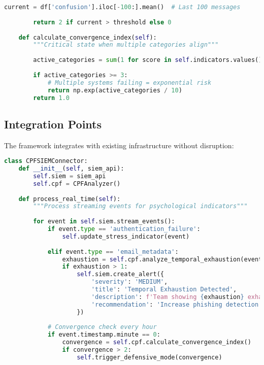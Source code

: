 \documentclass[11pt,a4paper]{article}
\begin{document}
\begin{lstlisting}[language=Python, caption=Core CPF Processing Pipeline]
        current = df['confusion'].iloc[-100:].mean()  # Last 100 messages
        
        return 2 if current > threshold else 0
        
    def calculate_convergence_index(self):
        """Critical state when multiple categories align"""
        
        active_categories = sum(1 for score in self.indicators.values() if score > 1)
        
        if active_categories >= 3:
            # Multiple systems failing = exponential risk
            return np.exp(active_categories / 10)
        return 1.0
\end{lstlisting}

\subsection{Integration Points}

The framework integrates with existing infrastructure without disruption:

\begin{lstlisting}[language=Python, caption=SIEM Integration Example]
class CPFSIEMConnector:
    def __init__(self, siem_api):
        self.siem = siem_api
        self.cpf = CPFAnalyzer()
        
    def process_real_time(self):
        """Process streaming events for psychological indicators"""
        
        for event in self.siem.stream_events():
            if event.type == 'authentication_failure':
                self.update_stress_indicator(event)
                
            elif event.type == 'email_metadata':
                exhaustion = self.cpf.analyze_temporal_exhaustion(event.data)
                if exhaustion > 1:
                    self.siem.create_alert({
                        'severity': 'MEDIUM',
                        'title': 'Temporal Exhaustion Detected',
                        'description': f'Team showing {exhaustion} exhaustion level',
                        'recommendation': 'Increase phishing detection sensitivity'
                    })
                    
            # Convergence check every hour
            if event.timestamp.minute == 0:
                convergence = self.cpf.calculate_convergence_index()
                if convergence > 2:
                    self.trigger_defensive_mode(convergence)
\end{lstlisting}
\end{document}
